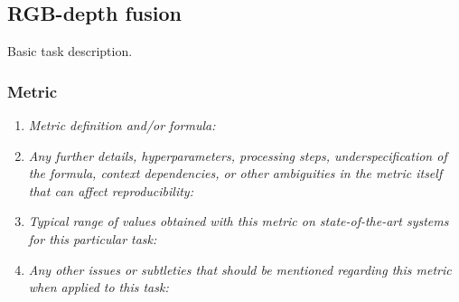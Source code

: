 \documentclass[a4paper,11pt]{article}
\begin{document}
\subsection{RGB-depth fusion} \label{rgb_depth_fusion}
    Basic task description.
    \subsubsection{Metric}
        \begin{enumerate}[label=\alph*.]
            \item \textit{Metric definition and/or formula:}
            \bigskip
            \item \textit{Any further details, hyperparameters, processing steps, underspecification of the formula, context dependencies, or other ambiguities in the metric itself that can affect reproducibility:}
            \bigskip
            \item \textit{Typical range of values obtained with this metric on state-of-the-art systems for this particular task:}
            \bigskip
            \item \textit{Any other issues or subtleties that should be mentioned regarding this metric when applied to this task:}
            \bigskip
        \end{enumerate}
\end{document}
